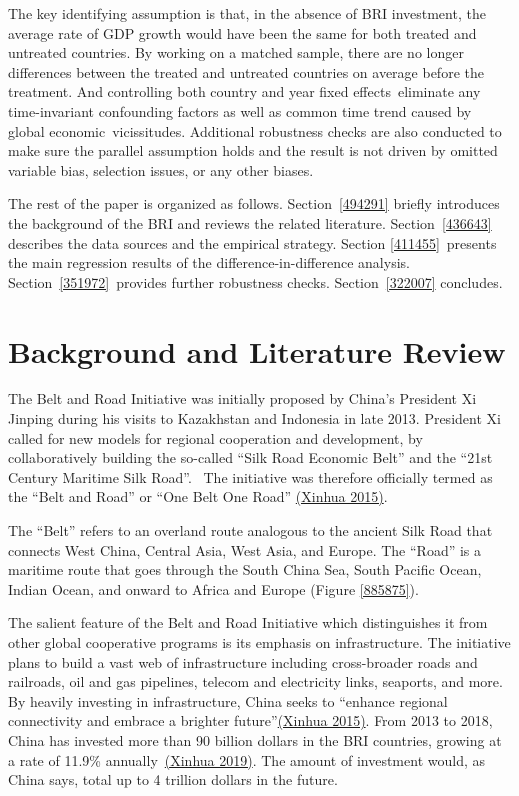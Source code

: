 \documentclass[10pt,a4paper]{article}
\begin{document}
The key identifying assumption is that, in the absence of BRI
investment, the average rate of GDP growth would have been the same for
both treated and untreated countries. By working on a matched sample,
there are no longer differences between the treated and untreated
countries on average before the treatment. And controlling both country
and year fixed effects~eliminate any time-invariant confounding factors
as well as common time trend caused by global economic~vicissitudes.
Additional robustness checks are also conducted to make sure the
parallel assumption holds and the result is not driven by omitted
variable bias, selection issues, or any other biases.

The rest of the paper is organized as follows.
Section~{\ref{494291}} briefly introduces the
background of the BRI and reviews the related literature.
Section~{\ref{436643}} describes the data sources and
the empirical strategy. Section {\ref{411455}}~presents
the main regression results of the difference-in-difference analysis.
Section~{\ref{351972}}~provides further robustness
checks. Section~{\ref{322007}} concludes.~

\par\null

\section{Background and Literature
Review}

{\label{494291}}

The Belt and Road Initiative was initially proposed by China's President
Xi Jinping during his visits to Kazakhstan and Indonesia in late 2013.
President Xi called for new models for regional cooperation and
development, by collaboratively building the so-called ``Silk Road
Economic Belt'' and the ``21st Century Maritime Silk Road''.~ The
initiative was therefore officially termed as the ``Belt and Road'' or
``One Belt One Road'' \hyperref[csl:2]{(Xinhua 2015)}.~

The ``Belt'' refers to an overland route analogous to the ancient Silk
Road that connects West China, Central Asia, West Asia, and Europe. The
``Road'' is a maritime route that goes through the South China Sea,
South Pacific Ocean, Indian Ocean, and onward to Africa and Europe
(Figure {\ref{885875}}).

The salient feature of the Belt and Road Initiative which distinguishes
it from other global cooperative programs is its emphasis on
infrastructure. The initiative plans to build a vast web of
infrastructure including cross-broader roads and railroads, oil and gas
pipelines, telecom and electricity links, seaports, and more. By heavily
investing in infrastructure, China seeks to ``enhance regional
connectivity and embrace a brighter future''\hyperref[csl:3]{(Xinhua 2015)}. From
2013 to 2018, China has invested more than 90 billion dollars in the BRI
countries, growing at a rate of 11.9\% annually~\hyperref[csl:4]{(Xinhua 2019)}. The
amount of investment would, as China says, total up to 4 trillion
dollars in the future.
\end{document}
